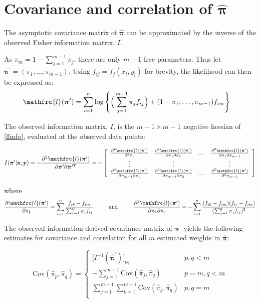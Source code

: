 \documentclass[12pt]{amsart}
\newcommand{\vect}[1]{\boldsymbol{\mathbf{#1}}}
\newcommand{\eqn}[1]{\begin{align*}
#1
\end{align*}}
\newcommand{\eqnl}[2]{\begin{align} \label{#1}
#2
\end{align}}
\newcommand{\mtx}[4]{
\[
#1 = #2
\left[ {\begin{array}{#3}
 #4
 \end{array} } \right]
\]
}
\newcommand{\eqnset}[4]{
\[ #1 = #2 \left\{ \begin{array}{#3}
        #4
\end{array} \right. \] 
}
\newcommand{\vx}{\vect{x}}
\newcommand{\vy}{\vect{y}}
\newcommand{\vp}{\vect{\pi}}
\newcommand{\vph}{\hat{\vect{\pi}}}
\newcommand{\pims}{1-\pi_1,\ldots,\pi_{m-1}}
\newcommand{\hessllg}[2]{\sumn \frac{f_{#1}}{(\sumg \pi_j f_j)^2 f_{#2}}}
\newcommand{\hesslld}[2]{\frac{\partial^2 \llpp}{\partial \pi_{#1} \partial \pi_{#2}}}
\newcommand{\sumn}{\sum^n_{i=1}}
\newcommand{\summ}{\sum^m_{j=1}}
\newcommand{\summo}{\sum^{m-1}_{j=1}}
\newcommand{\sumg}{\sum^g_{j=1}}
\newcommand{\vpg}{\vp^{\prime}}
\newcommand{\vpgh}{\hat{\vp}^{\prime}}
\newcommand{\llpp}{\mathfrc{l}(\vpg)}
\begin{document}
\clearpage
\section{Covariance and correlation of $\vph$}
The asymptotic covariance matrix of $\vph$ can be approximated by the inverse of the observed Fisher information matrix, $I$.

As $\pi_m = 1-\sum_{j=1}^{m-1}\pi_j$, there are only $m-1$ free parameters. Thus let $\vpg=(\pi_1,\ldots,\pi_{m-1})$. Using $f_{ij} = f_j(x_i,y_i)$ for brevity, the likelihood can then be expressed as:
\eqnl{llinfo}{
	\llpp &= \sumn \log \Bigg\{ \Big( \summo \pi_{j} f_{ij} \Big) + (\pims)f_{im} \Bigg\}	
}



The observed information matrix, $I$, is the $m-1\times m-1$ negative hessian of \eqref{llinfo}, evaluated at the observed data points:

\mtx{I(\vpg|\vx,\vy)=-\frac{\partial^2 \llpp}{\partial \vp^\prime \partial \vp^{\prime T}}}{-}{cccc}{
	\frac{\partial^2 \llpp}{\partial^2 \pi_1} & \hesslld{1}{2} & \ldots & \hesslld{1}{m-1}	\\
	\vdots & \vdots & & \vdots	\\
	\hesslld{m-1}{1} & \hesslld{m-1}{2} & \ldots & \frac{\partial^2 \llpp}{\partial^2 \pi_{m-1}}
}



where
\eqn{
	\frac{\partial \llpp}{\partial \pi_k} = \sumn \frac{f_{ik} - f_{im}}{\summ \pi_j f_{ij}}	\hspace{10mm}\text{and}\hspace{10mm}	\frac{\partial^2 \llpp}{\partial \pi_k \partial \pi_r} = -\sumn \frac{(f_{ik}-f_{im}) (f_{ir}-f_{im})}{(\sumg \pi_j f_{ij})^2}
}




The observed information derived covariance matrix of $\vpg$ yields the following estimates for covariance and correlation for all $m$ estimated weights in $\vph$:

\eqnset{\text{Cov}(\hat{\pi}_p,\hat{\pi}_q)}{}{ll}{
	\big[I^{-1}(\vpgh) \big]_{pq}				& p,q<m	\\
	-\sum\limits_{j=1}^{m-1} \text{Cov}(\hat{\pi}_j,\hat{\pi}_q)		& p=m,q<m	\\
	\sum\limits_{j=1}^{m-1} \sum\limits_{k=1}^{m-1} \text{Cov}(\hat{\pi}_j,\hat{\pi}_q)		& p, q=m	\\
}
\end{document}
